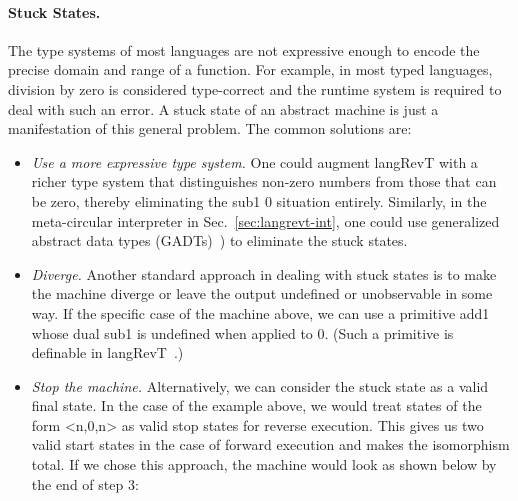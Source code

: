 \documentclass{llncs}
\begin{document}
\paragraph*{Stuck States.}
The type systems of most languages are not expressive enough to encode the
precise domain and range of a function. For example, in most typed languages,
division by zero is considered type-correct and the runtime system is
required to deal with such an error. A stuck state of an abstract machine is
just a manifestation of this general problem. The common solutions are:
\begin{itemize}
\item \emph{Use a more expressive type system.}  One could augment
  {{langRevT}} with a richer type system that distinguishes non-zero numbers
  from those that can be zero, thereby eliminating the {{sub1 0}} situation
  entirely. Similarly, in the meta-circular interpreter in
  Sec.~\ref{sec:langrevt-int}, one could use generalized abstract data types
  (GADTs)~\cite{phantom,Xi:2003:GRD:604131.604150}) to eliminate the stuck
  states.

\item \emph{Diverge.}  Another standard approach in dealing with stuck states
  is to make the machine diverge or leave the output undefined or
  unobservable in some way. If the specific case of the machine above, we can
  use a primitive {{add1}} whose dual {{sub1}} is undefined when applied to
  {{0}}. (Such a primitive is definable in
  {{langRevT}}~\cite[Sec.~4.2]{James:2012:IE:2103656.2103667}.)

\item \emph{Stop the machine.}  Alternatively, we can consider the stuck
  state as a valid final state. In the case of the example above, we would
  treat states of the form {{<n,0,n>}} as valid stop states for reverse
  execution. This gives us two valid start states in the case of forward
  execution and makes the isomorphism total. If we chose this approach, the
  machine would look as shown below by the end of {{step 3}}:


\begin{center}
\end{center}

\end{itemize}
\end{document}

